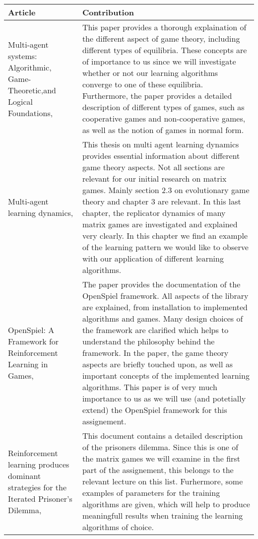 \documentclass[10pt,a4paper]{article}
\begin{document}
\bigskip
\begin{tabular}{|p{4cm}|p{9cm}|}
\hline 
Article & Contribution \\ 
\hline 
\hline
Multi-agent systems: Algorithmic, Game-Theoretic,and Logical Foundations, \citet{mas} & This paper provides a thorough explaination of the different aspect of game theory, including different types of equilibria. These concepts are of importance to us since we will investigate whether or not our learning algorithms converge to one of these equilibria. Furthermore, the paper provides a detailed description of different types of games, such as cooperative games and non-cooperative games, as well as the notion of games in normal form.   \\ 
\hline 
Multi-agent learning dynamics, \citet{phdthesis} &  This thesis on multi agent learning dynamics provides essential information about different game theory aspects. Not all sections are relevant for our initial research on matrix games. Mainly section 2.3 on evolutionary game theory and chapter 3 are relevant. In this last chapter, the replicator dynamics of many matrix games are investigated and explained very clearly. In this chapter we find an example of the learning pattern we would like to observe with our application of different learning algorithms.   \\
\hline 
OpenSpiel: A Framework for Reinforcement Learning in Games, \citet{lanctot2019openspiel} & The paper provides the documentation of the OpenSpiel framework. All aspects of the library are explained, from installation to implemented algorithms and games. Many design choices of the framework are clarified which helps to understand the philosophy behind the framework. In the paper, the game theory aspects are briefly touched upon, as well as important concepts of the implemented learning algorithms. This paper is of very much importance to us as we will use (and potetially extend) the OpenSpiel framework for this assignement. \\ 
\hline  
Reinforcement learning produces dominant strategies for the Iterated Prisoner’s Dilemma, \citet{rlforpd} & 
This document contains a detailed description of the prisoners dilemma. Since this is one of the matrix games we will examine in the first part of the assignement, this belongs to the relevant lecture on this list. Furhermore, some examples of parameters for the training algorithms are given, which will help to produce meaningfull results when training the learning algorithms of choice.\\ 

\end{tabular}
\end{document}
